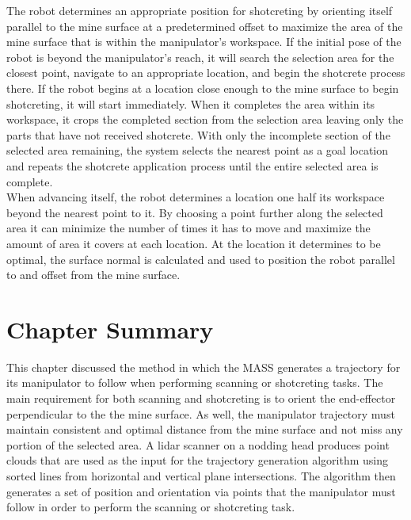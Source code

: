 The robot determines an appropriate position for shotcreting by orienting itself parallel to the mine surface at a predetermined offset to maximize the area of the mine surface that is within the manipulator's workspace. If the initial pose of the robot is beyond the manipulator's reach, it will search the selection area for the closest point, navigate to an appropriate location, and begin the shotcrete process there. If the robot begins at a location close enough to the mine surface to begin shotcreting, it will start immediately. When it completes the area within its workspace, it crops the completed section from the selection area leaving only the parts that have not received shotcrete. With only the incomplete section of the selected area remaining, the system selects the nearest point as a goal location and repeats the shotcrete application process until the entire selected area is complete.\\

When advancing itself, the robot determines a location one half its workspace beyond the nearest point to it. By choosing a point further along the selected area it can minimize the number of times it has to move and maximize the amount of area it covers at each location. At the location it determines to be optimal, the surface normal is calculated and used to position the robot parallel to and offset from the mine surface.\\

\section{Chapter Summary}
This chapter discussed the method in which the MASS generates a trajectory for its manipulator to follow when performing scanning or shotcreting tasks. The main requirement for both scanning and shotcreting is to orient the end-effector perpendicular to the the mine surface. As well, the manipulator trajectory must maintain consistent and optimal distance from the mine surface and not miss any portion of the selected area. A \acrshort{lidar} scanner on a nodding head produces point clouds that are used as the input for the trajectory generation algorithm using sorted lines from horizontal and vertical plane intersections. The algorithm then generates a set of position and orientation via points that the manipulator must follow in order to perform the scanning or shotcreting task.\\